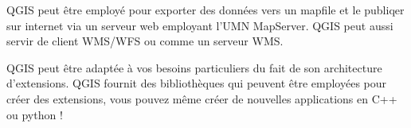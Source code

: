 


QGIS peut être employé pour exporter des données vers un mapfile et le publiqer sur internet via un serveur web employant l'UMN MapServer. QGIS peut aussi servir de client WMS/WFS ou comme un serveur WMS.




QGIS peut être adaptée à vos besoins particuliers du fait de son architecture d'extensions. QGIS fournit des bibliothèques qui peuvent être employées pour créer des extensions, vous pouvez même créer de nouvelles applications en C++ ou python !


